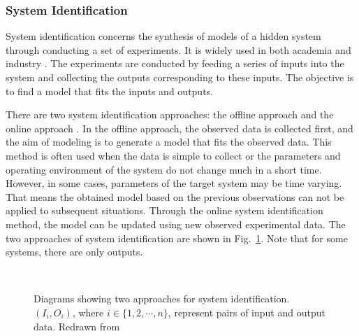 \subsubsection{System Identification}

System identification concerns the synthesis of models of a hidden system through conducting a set of experiments. It is widely used in both academia and industry \cite{Ljung_1999, Billings2013}. The experiments are conducted by feeding a series of inputs into the system and collecting the outputs corresponding to these inputs. The objective is to find a model that fits the inputs and outputs. 

There are two system identification approaches: the offline approach and the online approach \cite{Ljung_1999}. In the offline approach, the observed data is collected first, and the aim of modeling is to generate a model that fits the observed data. This method is often used when the data is simple to collect or the parameters and operating environment of the system do not change much in a short time. However, in some cases, parameters of the target system may be time varying. That means the obtained model based on the previous observations can not be applied to subsequent situations. Through the online system identification method, the model can be updated using new observed experimental data. The two approaches of system identification are shown in Fig.~\ref{fig:modeling_approaches}. Note that for some systems, there are only outputs.
 
\begin{figure}[!t]
  \centering
  \\
  \caption{Diagrams showing two approaches for system identification. $(I_i, O_i)$, where $i \in \lbrace1, 2, \cdots, n\rbrace$, represent pairs of input and output data. Redrawn from \cite{Bongard_2005}}
  \label{fig:modeling_approaches}
\end{figure}

